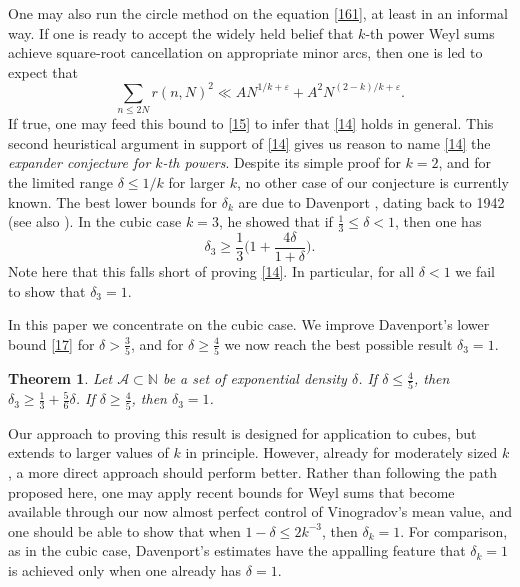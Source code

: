 \documentclass[reqno]{amsart}
\newcommand{\f}[2]{\frac{#1}{#2}}
\newtheorem{thm}{Theorem}[section]
\numberwithin{equation}{section}
\begin{document}
One may also run the circle method on the equation \eqref{161}, at least in an informal way. If one is ready to accept the widely held belief that $k$-th power Weyl sums achieve square-root cancellation on appropriate minor arcs, then one is led to expect that
$$ \sum_{n\le 2N} r(n,N)^2 \ll AN^{1/k+\varepsilon} + A^2N^{(2-k)/k+\varepsilon}.$$ 
If true, one may feed this bound to \eqref{15} to infer that \eqref{14} holds in general. This second heuristical argument in support of \eqref{14} gives us reason to name \eqref{14} the {\em expander conjecture for $k$-th powers}. Despite its simple proof for $k=2$, and for the limited range $\delta\le 1/k$ for larger $k$, no other case of our conjecture is currently known. The best lower bounds for $\delta_k$ are due to Davenport \cite{D}, dating back to 1942 (see also \cite[Theorem 6.2]{hlm}). In the cubic case $k=3$, he showed that if $\frac13 \le \delta <1$, then one has
\begin{equation}\label{17} \delta_3 \ge \frac13 \Big( 1+ \frac{4\delta}{1+\delta}\Big). \end{equation}
Note here that this falls short of proving \eqref{14}. In particular, for all $\delta<1$ we fail to show that $\delta_3=1$. 

In this paper we concentrate on the cubic case. We improve Davenport's lower bound \eqref{17} for $\delta > \frac35$, and for $\delta\ge \frac45$ we now reach the best possible result $\delta_3=1$. 

\begin{thm} \label{exp} Let $\mathscr A\subset \mathbb N$ be a set of exponential density $\delta$. If $\delta\le \f45$, then $\delta_3\ge \frac13 + \frac56\delta$. If $\delta \ge \frac45$, then $\delta_3=1$.
\end{thm}  

Our approach to proving this result is designed for application to cubes, but extends to larger values of $k$ in principle. However, already for moderately sized $k$, a more direct approach should perform better. Rather than following the path proposed here, one may apply recent bounds for Weyl sums \cite{BDG,TDW} that become available through our now almost perfect control of Vinogradov's mean value, and one should be able to show that when $1-\delta \le 2k^{-3}$, then $\delta_k=1$. For comparison, as in the cubic case, Davenport's estimates have the appalling feature that $\delta_k=1$ is achieved only when one already has $\delta=1$.
\end{document}
